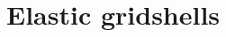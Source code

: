\documentclass[12pt,fleqn]{thesis}
\begin{document}
	

	\part{Elastic gridshells}\label{part=1}




\end{document}
